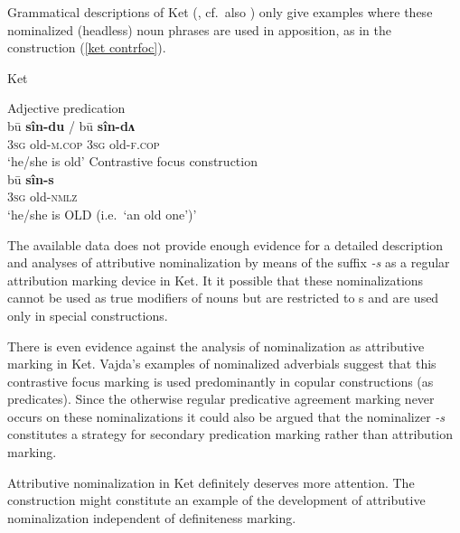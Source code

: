 Grammatical descriptions of Ket (\citealt{vajda2004}, cf.~also \citealt{krukova2007}) only give examples where these nominalized (headless) noun phrases are used in apposition, as in the  construction (\ref{ket contrfoc}). 
\begin{exe}
\ex 
\label{ket contrfoc}
\rm{Ket \citep{vajda2005}} 
\begin{xlist}
\ex	
\rm{Adjective predication}\\
\gll	bū \textbf{sîn-du} / bū \textbf{sîn-dʌ}\\
	3\textsc{sg} old-\textsc{m.cop} { } 3\textsc{sg} old-\textsc{f.cop}\\
\glt	‘he/she is old’
\ex	
\rm{Contrastive focus construction}\\
\gll	bū \textbf{sîn-s}\\
	3\textsc{sg} old-\textsc{nmlz}\\
\glt	‘he/she is OLD (i.e.~‘an old one’)’
\end{xlist}
\end{exe}
The available data does not provide enough evidence for a detailed description and analyses of attributive nominalization by means of the suffix \textit{-s} as a regular attribution marking device in Ket. It it possible that these nominalizations cannot be used as true modifiers of nouns but are restricted to s and are used only in special  constructions.

There is even evidence against the analysis of nominalization as attributive marking in Ket. Vajda's examples of nominalized adverbials suggest that this contrastive focus marking is used predominantly in copular constructions (as predicates). Since the otherwise regular predicative agreement marking never occurs on these nominalizations \cite[15]{vajda2004} it could also be argued that the nominalizer \textit{-s} constitutes a strategy for secondary predication marking rather than attribution marking.

Attributive nominalization in Ket definitely deserves more attention. The construction might constitute an example of the development of attributive nominalization independent of definiteness marking.

